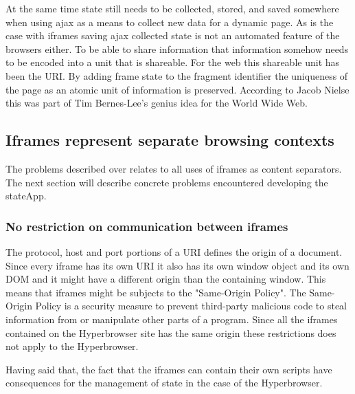\documentclass[english]{ifimaster}
\begin{document}
At the same time state still needs to be collected, stored, and saved somewhere when using ajax as a means to collect new data for a dynamic page. As is the case with iframes saving ajax collected state is not an automated feature of the browsers either. To be able to share information that information somehow needs to be encoded into a unit that is shareable. For the web this shareable unit has been the URI. By adding frame state to the fragment identifier the uniqueness of the page as an atomic unit of information is preserved. According to Jacob Nielse this was part of Tim Bernes-Lee's genius idea for the World Wide Web\parencite{nielsenFrames}. 


\subsection{Iframes represent separate browsing contexts}
The problems described over relates to all uses of iframes as content separators. The next section will describe concrete problems encountered developing the stateApp.

\subsubsection{No restriction on communication between iframes}
The protocol, host and port portions of a URI defines the origin of a document\parencite{flanagan}. Since every iframe has its own URI it also has its own window object and its own DOM and it might have a different origin than the containing window. This means that iframes might be subjects to the "Same-Origin Policy". The Same-Origin Policy is a security measure to prevent third-party malicious code to steal information from or manipulate other parts of a program. Since all the iframes contained on the Hyperbrowser site has the same origin these restrictions does not apply to the Hyperbrowser. 

Having said that, the fact that the iframes can contain their own scripts have consequences for the management of state in the case of the Hyperbrowser.
\end{document}
